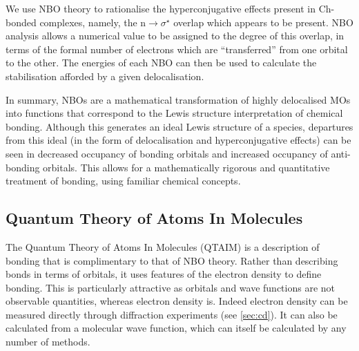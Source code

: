 \begin{refsection}
We use NBO theory to rationalise the hyperconjugative effects present in Ch-bonded complexes, namely, the $ \text{n}\rightarrow\sigma^{\star} $ overlap which appears to be present.
NBO analysis allows a numerical value to be assigned to the degree of this overlap, in terms of the formal number of electrons which are ``transferred'' from one orbital to the other.
The energies of each NBO can then be used to calculate the stabilisation afforded by a given delocalisation.

In summary, NBOs are a mathematical transformation of highly delocalised MOs into functions that correspond to the Lewis structure interpretation of chemical bonding.
Although this generates an ideal Lewis structure of a species, departures from this ideal (in the form of delocalisation and hyperconjugative effects) can be seen in decreased occupancy of bonding orbitals and increased occupancy of anti-bonding orbitals.
This allows for a mathematically rigorous and quantitative treatment of bonding, using familiar chemical concepts.

\subsection{Quantum Theory of Atoms In Molecules}\label{sec:qtaim}
The Quantum Theory of Atoms In Molecules (QTAIM) is a description of bonding that is complimentary to that of NBO theory.\autocite{Bader1991}
Rather than describing bonds in terms of orbitals, it uses features of the electron density to define bonding.
This is particularly attractive as orbitals and wave functions are not observable quantities, whereas electron density is.
Indeed electron density can be measured directly through diffraction experiments (see \cref{sec:cd}).
It can also be calculated from a molecular wave function, which can itself be calculated by any number of methods.


\end{refsection}
